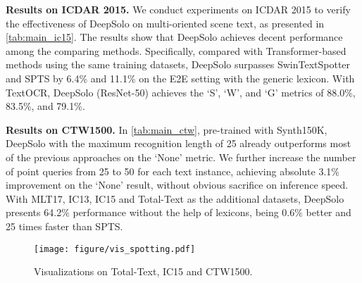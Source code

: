 \documentclass[10pt,twocolumn,letterpaper]{article}
\begin{document}
\noindent \textbf{Results on ICDAR 2015.} We conduct experiments on ICDAR 2015 to verify the effectiveness of DeepSolo on multi-oriented scene text, as presented in \cref{tab:main_ic15}. The results show that DeepSolo achieves decent performance among the comparing methods. Specifically, compared with Transformer-based methods using the same training datasets, DeepSolo surpasses SwinTextSpotter and SPTS by 6.4\% and 11.1\% on the E2E setting with the generic lexicon. With TextOCR, DeepSolo (ResNet-50) achieves the ‘S’, ‘W’, and ‘G’ metrics of 88.0\%, 83.5\%, and 79.1\%.

\noindent \textbf{Results on CTW1500.} In \cref{tab:main_ctw}, pre-trained with Synth150K, DeepSolo with the maximum recognition length of 25 already outperforms most of the previous approaches on the ‘None’ metric. We further increase the number of point queries from 25 to 50 for each text instance, achieving absolute 3.1$\%$ improvement on the ‘None’ result, without obvious sacrifice on inference speed. With MLT17, IC13, IC15 and Total-Text as the additional datasets, DeepSolo presents 64.2$\%$ performance without the help of lexicons, being 0.6$\%$ better and 25 times faster than SPTS.

\begin{figure}[!t]
    \centering
    \texttt{[image: figure/vis\_spotting.pdf]}
    \caption{Visualizations on Total-Text, IC15 and CTW1500.}
    \label{fig:qualitative_result}
\end{figure}
\end{document}
